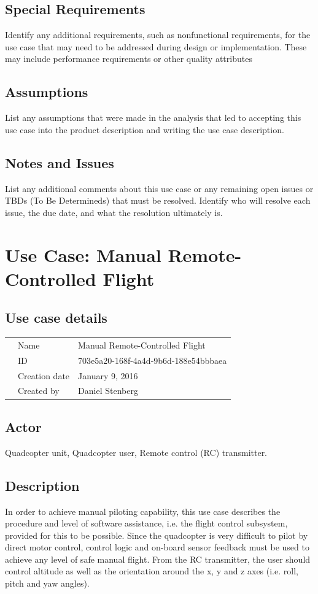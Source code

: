 \documentclass[a4paper]{article}
\begin{document}
\subsection{Special Requirements}
Identify any additional requirements, such as nonfunctional requirements, for the use case that may need to be addressed during design or implementation. These may include performance requirements or other quality attributes
\subsection{Assumptions}
List any assumptions that were made in the analysis that led to accepting this use case into the product description and writing the use case description.
\subsection{Notes and Issues}
List any additional comments about this use case or any remaining open issues or TBDs (To Be Determineds) that must be resolved. Identify who will resolve each issue, the due date, and what the resolution ultimately is.

\newpage

\section{Use Case: Manual Remote-Controlled Flight}
\subsection{Use case details}

\begin{tabular}{lll}
	&Name  & Manual Remote-Controlled Flight \\
	&ID  & 703e5a20-168f-4a4d-9b6d-188e54bbbaea \\
	&Creation date  & January 9, 2016 \\
	&Created by  & Daniel Stenberg 
\end{tabular}

\subsection{Actor}
Quadcopter unit, Quadcopter user, Remote control (RC) transmitter.

\subsection{Description}
In order to achieve manual piloting capability, this use case describes the procedure and level of software assistance, i.e. the flight control subsystem, provided for this to be possible. Since the quadcopter is very difficult to pilot by direct motor control, control logic and on-board sensor feedback must be used to achieve any level of safe manual flight. From the RC transmitter, the user should control altitude as well as the orientation around the x, y and z axes (i.e. roll, pitch and yaw angles).
\end{document}
